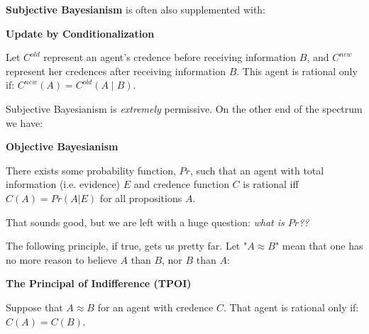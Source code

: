 \documentclass{tufte-handout}
\begin{document}
\noindent \textbf{Subjective Bayesianism} is often also supplemented with:

\begin{exbox}
    \textbf{Update by Conditionalization}

    \vspace{1mm}

    Let $C^{old}$ represent an agent’s credence before receiving information $B$, and $C^{new}$ represent her credences after receiving information $B$. This agent is rational only if: $C^{new}(A)=C^{old}(A\mid B)$.
\end{exbox}

\noindent Subjective Bayesianism is \textit{extremely} permissive. On the other end of the spectrum we have:

\begin{exbox}
    \textbf{Objective Bayesianism}

    \vspace{1mm}

    There exists some probability function, $Pr$, such that an agent with total information (i.e. evidence) $E$ and credence function $C$ is rational iff $C(A)=Pr(A|E)$ for all propositions $A$. 

\end{exbox}

\noindent That sounds good, but we are left with a huge question: \textit{what is $Pr$??}

\vspace{1mm}

\noindent The following principle, if true, gets us pretty far. Let "$A\approx B$" mean that one has no more reason to believe $A$ than $B$, nor $B$ than $A$:

\begin{exbox}
    \textbf{The Principal of Indifference (TPOI)}

\vspace{1mm}

Suppose that $A\!\approx\!B$ for an agent with credence $C$. That agent is rational only if: $C(A)=C(B)$.
    
\end{exbox}
\end{document}
